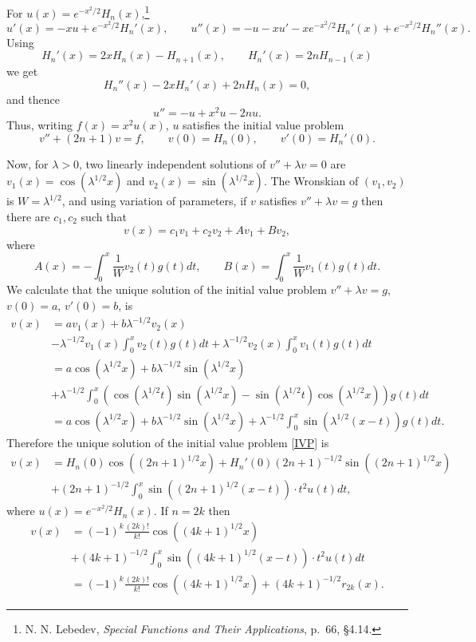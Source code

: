 \documentclass{article}
\theoremstyle{definition}
\theoremstyle{definition}
\begin{document}
For $u(x) = e^{-x^2/2} H_n(x)$,\footnote{N. N. Lebedev, {\em Special Functions and Their Applications},
p.~66, \S 4.14.}
\[
u'(x) = -xu +e^{-x^2/2} H_n'(x),\qquad u''(x) = -u-xu'-xe^{-x^2/2} H_n'(x)+e^{-x^2/2} H_n''(x).
\]
Using
\[
H_n'(x)=2xH_n(x)-H_{n+1}(x),\qquad H_n'(x)=2nH_{n-1}(x)
\]
we get
\[
H_n''(x)  - 2xH_n'(x) + 2nH_n(x) = 0,
\]
and thence
\[
u''= -u+x^2 u - 2nu.
\]
Thus, writing $f(x)=x^2 u(x)$, $u$ satisfies the initial value problem
\begin{equation}
v'' + (2n+1) v = f,\qquad v(0)=H_n(0),\qquad v'(0)=H_n'(0).
\label{IVP}
\end{equation}

Now, for $\lambda>0$, two linearly independent solutions of
$v'' + \lambda v = 0$
are $v_1(x) =\cos(\lambda^{1/2} x)$ and $v_2(x) = \sin(\lambda^{1/2}x)$. 
The Wronskian of $(v_1,v_2)$ is $W=\lambda^{1/2}$, and using variation of parameters, 
if $v$ satisfies $v''+\lambda v = g$ then
there are $c_1,c_2$ such that 
\[
v(x) = c_1v_1 + c_2v_2 + Av_1 + Bv_2,
\]
where
\[
A(x) = -\int_0^x \frac{1}{W} v_2(t) g(t) dt,\qquad B(x) = \int_0^x \frac{1}{W} v_1(t) g(t) dt.
\]
We calculate that the unique solution 
of the initial value problem $v''+\lambda v = g$, $v(0)=a$, $v'(0)=b$, is
\begin{align*}
v(x)& =  a v_1(x) +b \lambda^{-1/2} v_2(x)\\
&- \lambda^{-1/2} v_1(x) \int_0^x v_2(t) g(t) dt
+ \lambda^{-1/2} v_2(x) \int_0^x v_1(t) g(t) dt\\
&=a\cos(\lambda^{1/2} x) + b\lambda^{-1/2} \sin(\lambda^{1/2}x)\\
&+
\lambda^{-1/2} \int_0^x ( \cos(\lambda^{1/2} t) \sin(\lambda^{1/2} x) 
-\sin(\lambda^{1/2} t)\cos(\lambda^{1/2} x)) g(t) dt\\
&=a\cos(\lambda^{1/2} x) + b\lambda^{-1/2} \sin(\lambda^{1/2}x)+\lambda^{-1/2} \int_0^x \sin(\lambda^{1/2}(x-t)) g(t) dt.
\end{align*}
Therefore the unique solution of the initial value problem \eqref{IVP} is 
\begin{align*}
v(x) &= H_n(0) \cos((2n+1)^{1/2} x)+H_n'(0) (2n+1)^{-1/2} \sin((2n+1)^{1/2} x) \\
&+ (2n+1)^{-1/2} \int_0^x \sin((2n+1)^{1/2}(x-t)) \cdot t^2 u(t) dt,
\end{align*}
where $u(x) = e^{-x^2/2} H_n(x)$. 
If $n=2k$ then
\begin{align*}
v(x) &= (-1)^k \frac{(2k)!}{k!} \cos((4k+1)^{1/2}x)\\
&+(4k+1)^{-1/2} \int_0^x \sin((4k+1)^{1/2}(x-t))\cdot t^2 u(t) dt\\
&= (-1)^k \frac{(2k)!}{k!} \cos((4k+1)^{1/2}x) +(4k+1)^{-1/2}r_{2k}(x).
\end{align*}
\end{document}
